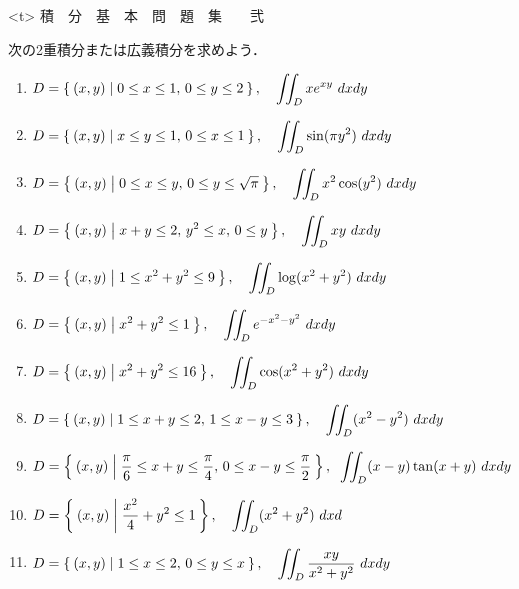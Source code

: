 \documentclass[11pt, uplatex, dvipdfmx]{jsarticle}
\newcommand{\ds}{\displaystyle}
\begin{document}
\thispagestyle{empty}


\begin{center}
  \pbox<t>{\Huge \hspace{1.5in} 積　分　基　本　問　題　集　　弐}
\end{center}

\newpage


次の2重積分または広義積分を求めよう．

  \vspace{.2in}

  \begin{enumerate}[(1)]
    \setlength{\itemsep}{.3in}
    
  \item $\ds D=\Set{ (x,y) | 0 \leq x \leq 1, \, 0 \leq y \leq 2}, \quad 
    \iint_D xe^{xy} \ dx dy$
    
  \item $\ds D=\Set{(x,y) | x \leq y \leq1, \, 0 \leq x \leq 1}, \quad
    \iint_D\sin (\pi y^2) \ dx dy$
    
  \item $\ds D=\Set{(x,y)  |  0 \leq x \leq y, \, 0 \leq y \leq \sqrt{\pi} }, \quad
    \iint_D x^2 \cos (y^2) \ dx dy$
    
  \item $\ds D=\Set{(x,y)  |  x+y \leq 2, \, y^2 \leq x, \, 0 \leq y}, \quad 
    \iint_D xy \ dx dy$

  \item $\ds   D=\Set{(x,y)  |  1 \leq x^2+y^2 \leq 9 }, \quad 
    \iint_D \log(x^2+y^2) \ dx dy$
    
  \item $\ds   D=\Set{(x,y) | x^2+y^2 \leq 1}, \quad
    \iint_D e^{-x^2-y^2}  \ dx dy$

  \item $\ds D=\Set{(x,y) | x^2+y^2 \leq 16 }, \quad 
    \iint_D \cos(x^2+y^2) \ dx dy$
    
  \item $\ds D=\Set{(x,y) | 1 \leq x+y \leq 2, \, 1 \leq x-y \leq 3 }, \quad
    \iint_D (x^2-y^2) \ dx dy$
    
  \item $\ds D=\Set{(x,y) | \frac{\pi}{6} \leq x+y \leq \frac{\pi}{4},
      \, 0 \leq x-y \leq \frac{\pi}{2} }, \; \;
    \iint_D (x-y)\tan(x+y) \ dx dy$
    
  \item $\ds D=\Set{ (x,y) | \frac{x^2}{4} + y^2 \leq 1 }, \quad
    \iint_D(x^2+y^2) \ dx d $
    
  \item $\ds D=\Set{ (x,y) | 1 \leq x \leq 2, \, 0 \leq y \leq x }, \quad
    \iint_D \frac{xy}{x^2+y^2} \ dx dy$
    

\end{enumerate}
\end{document}

